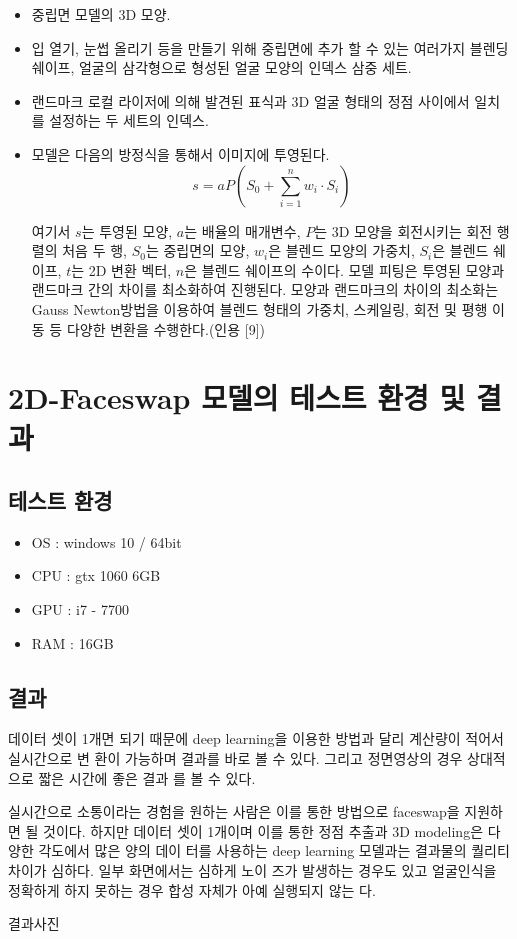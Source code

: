 \documentclass{oblivoir}
\newcommand{\spec}{
\begin{itemize}
    \item OS : windows 10 / 64bit
    \item CPU : gtx 1060 6GB
    \item GPU : i7 - 7700
    \item RAM : 16GB
\end{itemize}
}
\begin{document}
\begin{itemize}
    \item 중립면 모델의 3D 모양.
    \item 입 열기, 눈썹 올리기 등을 만들기 위해 중립면에 추가 할 수 있는 여러가지 블렌딩 쉐이프, 얼굴의 삼각형으로 형성된 얼굴 모양의 인덱스 삼중 세트.
    \item 랜드마크 로컬 라이저에 의해 발견된 표식과 3D 얼굴 형태의 정점 사이에서 일치를 설정하는 두 세트의 인덱스.
    \item 모델은 다음의 방정식을 통해서 이미지에 투영된다.
    \[ s = aP \left( S_{0} + \sum_{i=1}^{n} w_{i}\cdot S_{i}  \right)   \]

    여기서 $s$는 투영된 모양, $a$는 배율의 매개변수, $P$는 3D 모양을 회전시키는 회전 행렬의 처음 두 행, $S_0$는 중립면의 모양, $w_i$은 블렌드 모양의 가중치, $S_i$은 블렌드 쉐이프, $t$는 2D 변환 벡터, $n$은 블렌드 쉐이프의 수이다.
    모델 피팅은 투영된 모양과 랜드마크 간의 차이를 최소화하여 진행된다. 모양과 랜드마크의 차이의 최소화는 Gauss Newton방법을 이용하여 블렌드 형태의 가중치, 스케일링, 회전 및 평행 이동 등 다양한 변환을 수행한다.(인용 [9])
\end{itemize}

\section{2D-Faceswap 모델의 테스트 환경 및 결과}

\subsection{테스트 환경}
\spec
\subsection{결과}

데이터 셋이 1개면 되기 때문에 deep learning을 이용한 방법과 달리 계산량이 적어서 실시간으로 변 환이 가능하며 결과를 바로 볼 수 있다. 그리고 정면영상의 경우 상대적으로 짧은 시간에 좋은 결과 를 볼 수 있다.

실시간으로 소통이라는 경험을 원하는 사람은 이를 통한 방법으로 faceswap을 지원하면 될 것이다.  하지만 데이터 셋이 1개이며 이를 통한 정점 추출과 3D modeling은 다양한 각도에서 많은 양의 데이 터를 사용하는 deep learning 모델과는 결과물의 퀄리티 차이가 심하다. 일부 화면에서는 심하게 노이 즈가 발생하는 경우도 있고 얼굴인식을 정확하게 하지 못하는 경우 합성 자체가 아예 실행되지 않는 다.

결과사진 
\end{document}
